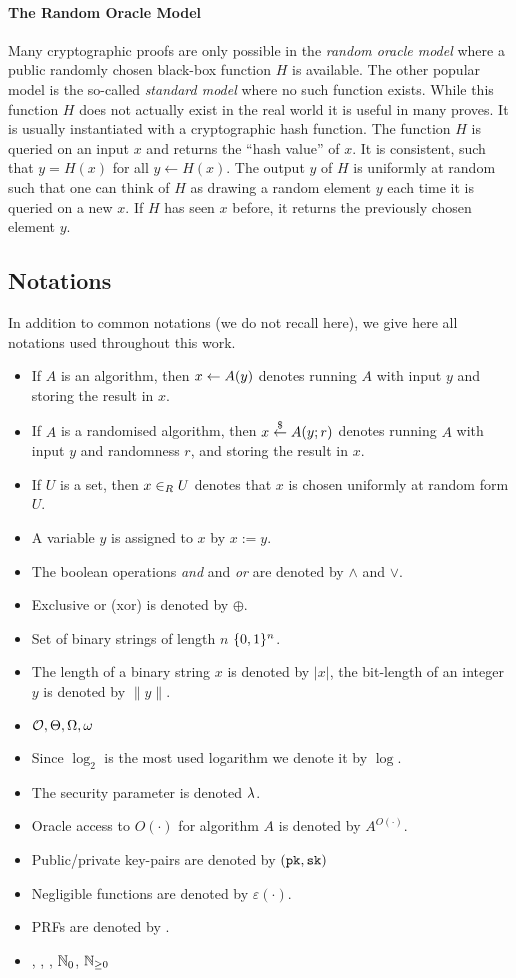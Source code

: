 \paragraph{The Random Oracle Model}
Many cryptographic proofs are only possible in the \emph{random oracle model} where a public randomly chosen black-box function $H$ is available.
The other popular model is the so-called \emph{standard model} where no such function exists.
While this function $H$ does not actually exist in the real world it is useful in many proves.
It is usually instantiated with a cryptographic hash function.
The function $H$ is queried on an input $x$ and returns the ``hash value'' of $x$.
It is consistent, such that $y=H(x)$ for all $y\gets H(x)$.
The output $y$ of $H$ is uniformly at random such that one can think of $H$ as drawing a random element $y$ each time it is queried on a new $x$.
If $H$ has seen $x$ before, it returns the previously chosen element $y$.

\subsection{Notations}
In addition to common notations (we do not recall here), we give here all notations used throughout this work.
\begin{itemize}
	\item If $A$ is an algorithm, then $x\gets A(y)$ denotes running $A$ with input $y$ and storing the result in $x$.
	\item If $A$ is a randomised algorithm, then $x\stackrel{\$}{\gets} A(y;r)$ denotes running $A$ with input $y$ and randomness $r$, and storing the result in $x$.
	\item If $U$ is a set, then $x\in_R U$ denotes that $x$ is chosen uniformly at random form $U$.
	\item A variable $y$ is assigned to $x$ by $x:=y$.
	\item The boolean operations \emph{and} and \emph{or} are denoted by $\wedge$ and $\vee$.
	\item Exclusive or (xor) is denoted by $\oplus$.
	\item Set of binary strings of length $n$ $\{0,1\}^n$.
	\item The length of a binary string $x$ is denoted by $|x|$, the bit-length of an integer $y$ is denoted by $\|y\|$.
	\item $\mathcal{O},\Theta,\Omega,\omega$
	\item Since $\log_2$ is the most used logarithm we denote it by $\log$.
	\item The security parameter is denoted $\lambda$.
	\item Oracle access to $O(\cdot)$ for algorithm $A$ is denoted by $A^{O(\cdot)}$.
	\item Public/private key-pairs are denoted by $(\mathtt{pk},\mathtt{sk})$
	\item Negligible functions are denoted by $\varepsilon(\cdot)$.
	\item \aclp{PRF} are denoted by \PRF.
	\item \ZZ, \NN, \RR, $\mathbb{N}_0$, $\mathbb{N}_{\geq 0}$
\end{itemize}


